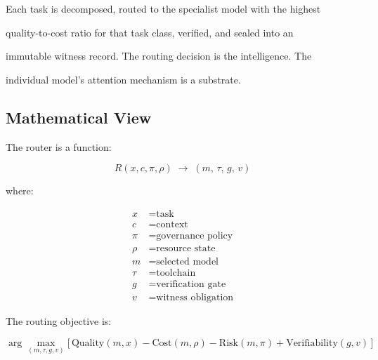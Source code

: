 \medskip





Each task is decomposed, routed to the specialist model with the highest


quality-to-cost ratio for that task class, verified, and sealed into an


immutable witness record. The routing decision is the intelligence. The


individual model's attention mechanism is a substrate.





\subsection{Mathematical View}





The router is a function:


\[


R(x, c, \pi, \rho) \;\rightarrow\; (m,\, \tau,\, g,\, v)


\]





where:


\begin{align*}


x &= \text{task} \\


c &= \text{context} \\


\pi &= \text{governance policy} \\


\rho &= \text{resource state} \\


m &= \text{selected model} \\


\tau &= \text{toolchain} \\


g &= \text{verification gate} \\


v &= \text{witness obligation}


\end{align*}





\noindent The routing objective is:


\[


\arg\max_{(m,\tau,g,v)} \bigl[\,\mathrm{Quality}(m,x) - \mathrm{Cost}(m,\rho)


- \mathrm{Risk}(m,\pi) + \mathrm{Verifiability}(g,v)\,\bigr]


\]





